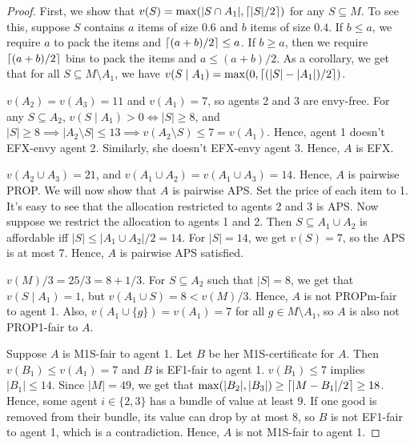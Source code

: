 \begin{proof}
First, we show that $v(S) = \max(|S \cap A_1|, \lceil |S|/2 \rceil)$ for any $S \subseteq M$.
To see this, suppose $S$ contains $a$ items of size $0.6$ and $b$ items of size $0.4$.
If $b \le a$, we require $a$ to pack the items and $\lceil (a+b)/2 \rceil \le a$.
If $b \ge a$, then we require $\lceil (a+b)/2 \rceil$ bins to pack the items and $a \le (a+b)/2$.
As a corollary, we get that for all $S \subseteq M \setminus A_1$,
we have $v(S \mid A_1) = \max(0, \lceil (|S|-|A_1|)/2 \rceil)$.

$v(A_2) = v(A_3) = 11$ and $v(A_1) = 7$, so agents 2 and 3 are envy-free.
For any $S \subseteq A_2$, $v(S \mid A_1) > 0 \iff |S| \ge 8$,
and $|S| \ge 8 \implies |A_2 \setminus S| \le 13 \implies v(A_2 \setminus S) \le 7 = v(A_1)$.
Hence, agent 1 doesn't EFX-envy agent 2. Similarly, she doesn't EFX-envy agent 3.
Hence, $A$ is EFX.

$v(A_2 \cup A_3) = 21$, and $v(A_1 \cup A_2) = v(A_1 \cup A_3) = 14$.
Hence, $A$ is pairwise PROP. We will now show that $A$ is pairwise APS.
Set the price of each item to 1.
It's easy to see that the allocation restricted to agents 2 and 3 is APS.
Now suppose we restrict the allocation to agents 1 and 2.
Then $S \subseteq A_1 \cup A_2$ is affordable iff $|S| \le |A_1 \cup A_2|/2 = 14$.
For $|S| = 14$, we get $v(S) = 7$, so the APS is at most 7.
Hence, $A$ is pairwise APS satisfied.

$v(M)/3 = 25/3 = 8 + 1/3$.
For $S \subseteq A_2$ such that $|S| = 8$, we get that $v(S \mid A_1) = 1$,
but $v(A_1 \cup S) = 8 < v(M)/3$. Hence, $A$ is not PROPm-fair to agent 1.
Also, $v(A_1 \cup \{g\}) = v(A_1) = 7$ for all $g \in M \setminus A_1$,
so $A$ is also not PROP1-fair to $A$.

Suppose $A$ is M1S-fair to agent 1. Let $B$ be her M1S-certificate for $A$.
Then $v(B_1) \le v(A_1) = 7$ and $B$ is EF1-fair to agent 1.
$v(B_1) \le 7$ implies $|B_1| \le 14$. Since $|M| = 49$, we get that
$\max(|B_2|, |B_3|) \ge \lceil |M - B_1|/2 \rceil \ge 18$.
Hence, some agent $i \in \{2, 3\}$ has a bundle of value at least $9$.
If one good is removed from their bundle, its value can drop by at most $8$,
so $B$ is not EF1-fair to agent 1, which is a contradiction.
Hence, $A$ is not M1S-fair to agent 1.
\end{proof}

